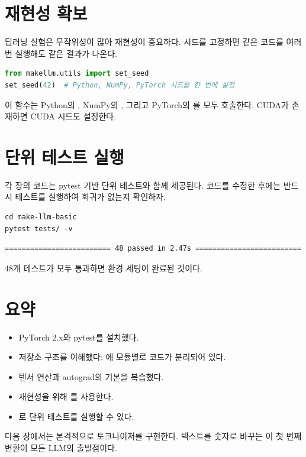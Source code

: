 \section{재현성 확보}

딥러닝 실험은 무작위성이 많아 재현성이 중요하다. 시드를 고정하면 같은 코드를 여러 번 실행해도 같은 결과가 나온다.

\begin{lstlisting}[language=Python]
from makellm.utils import set_seed
set_seed(42)  # Python, NumPy, PyTorch 시드를 한 번에 설정
\end{lstlisting}

이 함수는 Python의 , NumPy의 , 그리고 PyTorch의 를 모두 호출한다. CUDA가 존재하면 CUDA 시드도 설정한다.

\section{단위 테스트 실행}

각 장의 코드는 pytest 기반 단위 테스트와 함께 제공된다. 코드를 수정한 후에는 반드시 테스트를 실행하여 회귀가 없는지 확인하자.

\begin{lstlisting}[style=bashstyle]
cd make-llm-basic
pytest tests/ -v
\end{lstlisting}

\begin{lstlisting}[style=bashstyle, basicstyle=\ttfamily\small]
========================= 48 passed in 2.47s =========================
\end{lstlisting}

48개 테스트가 모두 통과하면 환경 세팅이 완료된 것이다.

\section{요약}

\begin{itemize}
  \item PyTorch 2.x와 pytest를 설치했다.
  \item 저장소 구조를 이해했다: 에 모듈별로 코드가 분리되어 있다.
  \item 텐서 연산과 autograd의 기본을 복습했다.
  \item 재현성을 위해 를 사용한다.
  \item {}로 단위 테스트를 실행할 수 있다.
\end{itemize}

다음 장에서는 본격적으로 토크나이저를 구현한다. 텍스트를 숫자로 바꾸는 이 첫 번째 변환이 모든 LLM의 출발점이다.
